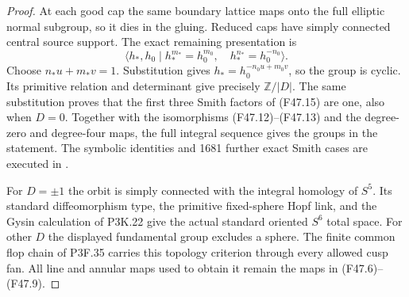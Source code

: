 \begin{proof}
At each good cap the same boundary lattice maps onto the full
elliptic normal subgroup, so it dies in the gluing. Reduced
caps have simply connected central source support. The exact
remaining presentation is
\[
 \langle h_*,h_0\mid h_*^{m_*}=h_0^{m_0},\quad
                         h_*^{n_*}=h_0^{-n_0}\rangle .
\]
Choose $n_*u+m_*v=1$. Substitution gives
$h_*=h_0^{-n_0u+m_0v}$, so the group is cyclic.
Its primitive relation and determinant give precisely
$\mathbb Z/|D|$. The same substitution proves that the first
three Smith factors of (F47.15) are one, also when $D=0$.
Together with the isomorphisms (F47.12)--(F47.13) and the
degree-zero and degree-four maps, the full integral sequence
gives the groups in the statement.
The symbolic identities and 1681 further exact Smith cases
are executed in .

For $D=\pm1$ the orbit is simply connected with the integral
homology of $S^5$. Its standard diffeomorphism type, the
primitive fixed-sphere Hopf link, and the Gysin calculation of
P3K.22 give the actual standard oriented $S^6$ total space.
For other $D$ the displayed fundamental group excludes a
sphere. The finite common flop chain of P3F.35 carries this
topology criterion through every allowed cusp fan. All line
and annular maps used to obtain it remain the maps in
(F47.6)--(F47.9).
\end{proof}
